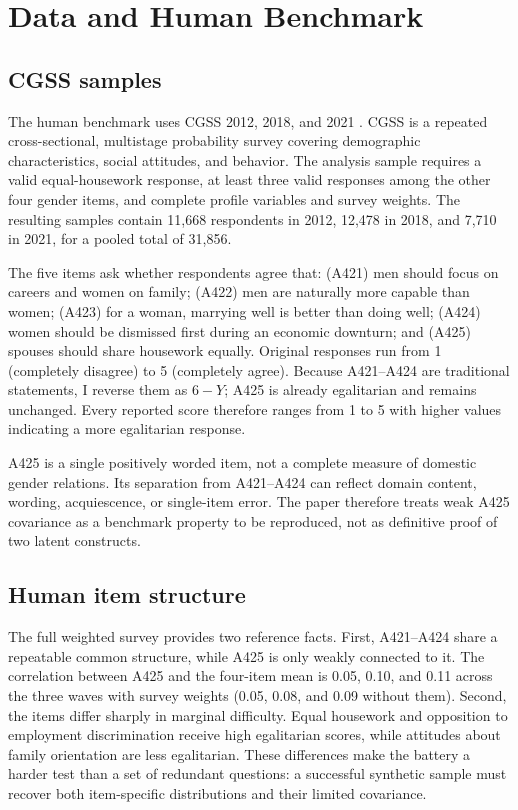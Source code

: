 \documentclass[11pt]{article}
\begin{document}
\section{Data and Human Benchmark}

\subsection{CGSS samples}

The human benchmark uses CGSS 2012, 2018, and 2021 \citep{cgssdata}. CGSS is a repeated cross-sectional, multistage probability survey covering demographic characteristics, social attitudes, and behavior. The analysis sample requires a valid equal-housework response, at least three valid responses among the other four gender items, and complete profile variables and survey weights. The resulting samples contain 11,668 respondents in 2012, 12,478 in 2018, and 7,710 in 2021, for a pooled total of 31,856.

The five items ask whether respondents agree that: (A421) men should focus on careers and women on family; (A422) men are naturally more capable than women; (A423) for a woman, marrying well is better than doing well; (A424) women should be dismissed first during an economic downturn; and (A425) spouses should share housework equally. Original responses run from 1 (completely disagree) to 5 (completely agree). Because A421--A424 are traditional statements, I reverse them as $6-Y$; A425 is already egalitarian and remains unchanged. Every reported score therefore ranges from 1 to 5 with higher values indicating a more egalitarian response.

A425 is a single positively worded item, not a complete measure of domestic gender relations. Its separation from A421--A424 can reflect domain content, wording, acquiescence, or single-item error. The paper therefore treats weak A425 covariance as a benchmark property to be reproduced, not as definitive proof of two latent constructs.

\subsection{Human item structure}

The full weighted survey provides two reference facts. First, A421--A424 share a repeatable common structure, while A425 is only weakly connected to it. The correlation between A425 and the four-item mean is 0.05, 0.10, and 0.11 across the three waves with survey weights (0.05, 0.08, and 0.09 without them). Second, the items differ sharply in marginal difficulty. Equal housework and opposition to employment discrimination receive high egalitarian scores, while attitudes about family orientation are less egalitarian. These differences make the battery a harder test than a set of redundant questions: a successful synthetic sample must recover both item-specific distributions and their limited covariance.
\end{document}
